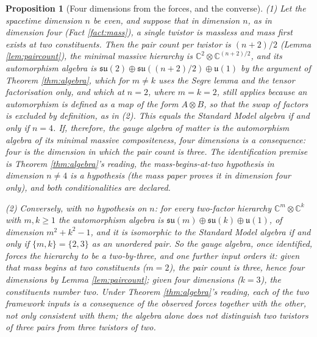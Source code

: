 \documentclass[11pt]{article}
\newtheorem{proposition}[theorem]{Proposition}
\theoremstyle{definition}
\newcommand{\C}{\mathbb{C}}
\newcommand{\su}{\mathfrak{su}}
\newcommand{\uu}{\mathfrak{u}}
\begin{document}
\begin{proposition}[Four dimensions from the forces, and the converse]\label{prop:four}
(1) Let the spacetime dimension $n$ be even, and suppose that in dimension $n$, as in dimension four (Fact \ref{fact:mass}), a single twistor is massless and mass first exists at two constituents. Then the pair count per twistor is $(n+2)/2$ (Lemma \ref{lem:paircount}), the minimal massive hierarchy is $\C^{2} \otimes \C^{(n+2)/2}$, and its automorphism algebra is $\su(2) \oplus \su((n+2)/2) \oplus \uu(1)$ by the argument of Theorem \ref{thm:algebra}, which for $m \neq k$ uses the Segre lemma and the tensor factorisation only, and which at $n = 2$, where $m = k = 2$, still applies because an automorphism is defined as a map of the form $A \otimes B$, so that the swap of factors is excluded by definition, as in (2). This equals the Standard Model algebra if and only if $n = 4$. If, therefore, the gauge algebra of matter is the automorphism algebra of its minimal massive compositeness, four dimensions is a consequence: four is the dimension in which the pair count is three. The identification premise is Theorem \ref{thm:algebra}'s reading, the mass-begins-at-two hypothesis in dimension $n \neq 4$ is a hypothesis (the mass paper proves it in dimension four only), and both conditionalities are declared.

(2) Conversely, with no hypothesis on $n$: for every two-factor hierarchy $\C^{m} \otimes \C^{k}$ with $m, k \ge 1$ the automorphism algebra is $\su(m) \oplus \su(k) \oplus \uu(1)$, of dimension $m^{2} + k^{2} - 1$, and it is isomorphic to the Standard Model algebra if and only if $\{m, k\} = \{2, 3\}$ as an unordered pair. So the gauge algebra, once identified, forces the hierarchy to be a two-by-three, and one further input orders it: given that mass begins at two constituents ($m = 2$), the pair count is three, hence four dimensions by Lemma \ref{lem:paircount}; given four dimensions ($k = 3$), the constituents number two. Under Theorem \ref{thm:algebra}'s reading, each of the two framework inputs is a consequence of the observed forces together with the other, not only consistent with them; the algebra alone does not distinguish two twistors of three pairs from three twistors of two.
\end{proposition}
\end{document}
